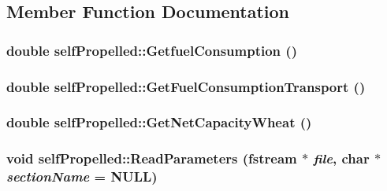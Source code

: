 \subsection{Member Function Documentation}
\hypertarget{classself_propelled_a8404b0e95f4a48b0782809fab42395a6}{
\subsubsection[{GetfuelConsumption}]{\setlength{\rightskip}{0pt plus 5cm}double selfPropelled::GetfuelConsumption ()}}
\label{classself_propelled_a8404b0e95f4a48b0782809fab42395a6}
\hypertarget{classself_propelled_acb2c1c8578b6fa7654d80f3f50cb4b41}{
\subsubsection[{GetFuelConsumptionTransport}]{\setlength{\rightskip}{0pt plus 5cm}double selfPropelled::GetFuelConsumptionTransport ()}}
\label{classself_propelled_acb2c1c8578b6fa7654d80f3f50cb4b41}
\hypertarget{classself_propelled_ad1183006977e6dfb2e78cd6d72bafe68}{
\subsubsection[{GetNetCapacityWheat}]{\setlength{\rightskip}{0pt plus 5cm}double selfPropelled::GetNetCapacityWheat ()}}
\label{classself_propelled_ad1183006977e6dfb2e78cd6d72bafe68}
\hypertarget{classself_propelled_a13e862db150a5804947fe838384529df}{
\subsubsection[{ReadParameters}]{\setlength{\rightskip}{0pt plus 5cm}void selfPropelled::ReadParameters (fstream $\ast$ {\em file}, \/  char $\ast$ {\em sectionName} = {\ttfamily NULL})}}
\label{classself_propelled_a13e862db150a5804947fe838384529df}


